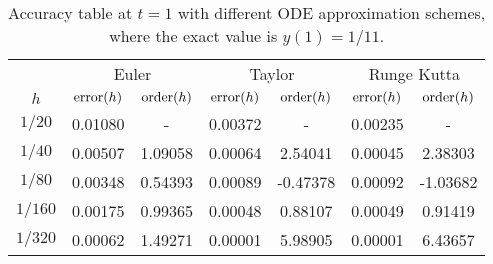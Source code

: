 \begin{table}[H]
\centering
\caption{Accuracy table at $t=1$ with different ODE approximation schemes, where the exact value is $y(1) = 1/11$.}
\begin{tabular}{ccccccc}
\toprule
 $\phantom{h}$ & \multicolumn{2}{c}{Euler} & \multicolumn{2}{c}{Taylor} & \multicolumn{2}{c}{Runge Kutta} \\
           $h$ & ${\rm error}(h)$ & ${\rm order}(h)$ & ${\rm error}(h)$ & ${\rm order}(h)$ & ${\rm error}(h)$ & ${\rm order}(h)$ \\
\midrule
        $1/20$ &          0.01080 &                - &          0.00372 &                - &          0.00235 &                - \\
        $1/40$ &          0.00507 &          1.09058 &          0.00064 &          2.54041 &          0.00045 &          2.38303 \\
        $1/80$ &          0.00348 &          0.54393 &          0.00089 &         -0.47378 &          0.00092 &         -1.03682 \\
       $1/160$ &          0.00175 &          0.99365 &          0.00048 &          0.88107 &          0.00049 &          0.91419 \\
       $1/320$ &          0.00062 &          1.49271 &          0.00001 &          5.98905 &          0.00001 &          6.43657 \\
\bottomrule
\end{tabular}
\end{table}
